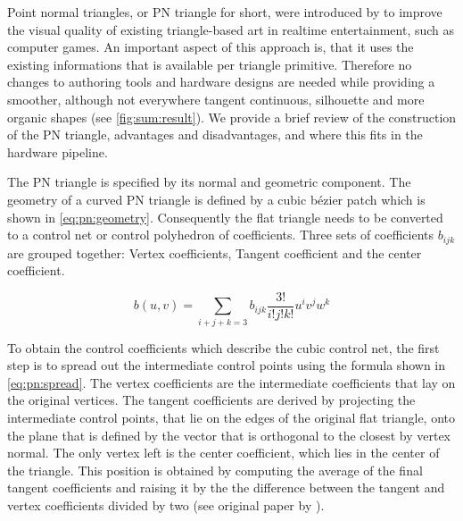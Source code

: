 
\begin{figure*}
	\centering
	\caption{From left to right (a) Input triangulation, (b) Gouraud shaded input triangulation, (c) geometric component of the PN triangles (shaded according to surface normal variation), and (d) curved PN Triangles (shaded with independently constructed quadratically varying normals)}
	\label{fig:sum:result}
\end{figure*}

Point normal triangles, or PN triangle for short, were introduced by \cite{vlachos2001curved} to improve the visual quality of existing triangle-based art in realtime entertainment, such as computer games. An important aspect of this approach is, that it uses the existing informations that is available per triangle primitive. Therefore no changes to authoring tools and hardware designs are needed while providing a smoother, although not everywhere tangent continuous, silhouette and more organic shapes (see \cref{fig:sum:result}). We provide a brief review of the construction of the PN triangle, advantages and disadvantages, and where this fits in the hardware pipeline. 

The PN triangle is specified by its normal and geometric component. The geometry of a curved PN triangle is defined by a cubic b\'ezier patch which is shown in \eqref{eq:pn:geometry}. Consequently the flat triangle needs to be converted to a control net or control polyhedron of coefficients. Three sets of coefficients $b_{ijk}$ are grouped together: Vertex coefficients, Tangent coefficient and the center coefficient.

\begin{equation}\label{eq:pn:geometry}
	b(u,v) = \sum\limits_{i+j+k=3} b_{ijk} \frac{3!}{i!j!k!} u^i v^j w^k
\end{equation}

To obtain the control coefficients which describe the cubic control net, the first step is to spread out the intermediate control points using the formula shown in \eqref{eq:pn:spread}. The vertex coefficients are the intermediate coefficients that lay on the original vertices. The tangent coefficients are derived by projecting the intermediate control points, that lie on the edges of the original flat triangle, onto the plane that is defined by the vector that is orthogonal to the closest by vertex normal. The only vertex left is the center coefficient, which lies in the center of the triangle. This position is obtained by computing the average of the final tangent coefficients and raising it by the the difference between the tangent and vertex coefficients divided by two (see original paper by \citeauthor{vlachos2001curved}).

